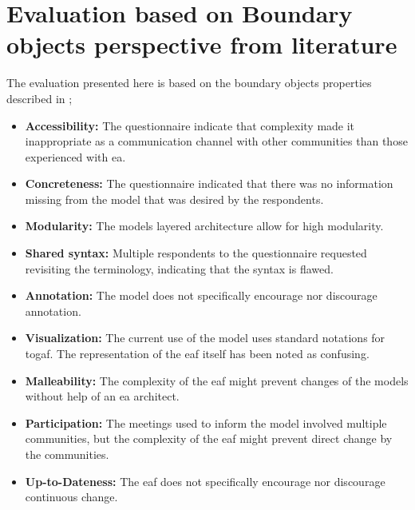 \section{Evaluation based on Boundary objects perspective from literature}
The evaluation presented here is based on the \glspl{boundary object} properties described in \cite{abraham2015crossing};
\begin{itemize}
    \item \textbf{Accessibility:} The questionnaire indicate that complexity made it inappropriate as a communication channel with other communities than those experienced with \gls{ea}.  
    \item \textbf{Concreteness:} The questionnaire indicated that there was no information missing from the model that was desired by the respondents.  
    \item \textbf{Modularity:} The models layered architecture allow for high modularity.
    \item \textbf{Shared syntax:} Multiple respondents to the questionnaire requested revisiting the terminology, indicating that the syntax is flawed.
    \item \textbf{Annotation:} The model does not specifically encourage nor discourage annotation.
    \item \textbf{Visualization:} The current use of the model uses standard notations for \gls{togaf}. The representation of the \gls{eaf} itself has been noted as confusing. 
    \item \textbf{Malleability:} The complexity of the \gls{eaf} might prevent changes of the models without help of an \gls{ea} architect. 
    \item \textbf{Participation:} The meetings used to inform the model involved multiple communities, but the complexity of the \gls{eaf} might prevent direct change by the communities. 
    \item \textbf{Up-to-Dateness:} The \gls{eaf} does not specifically encourage nor discourage continuous change.   
\end{itemize}

